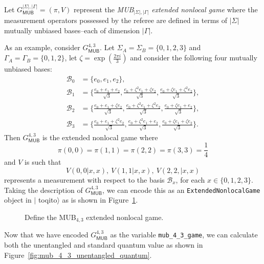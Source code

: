 \documentclass[nofootinbib,superscriptaddress,a4paper,twocolumn,longbibliography,floatfix,pra]{revtex4-2}
\renewcommand{\abs}[1]{\lvert #1 \rvert}
\newcommand{\toqitofont}{%
	\fontfamily{FiraSans}%
	\selectfont}
\newcommand{\toqito}{ $|${\toqitofont toqito}$\rangle$\xspace}
\newcommand{\B}{\mathcal{B}}
\def\MUB{\mathsf{MUB}}
\begin{document}
Let $G_{\MUB}^{\abs{\Sigma}, \abs{\Gamma}} = (\pi, V)$ represent the
\emph{MUB$_{\abs{\Sigma}, \abs{\Gamma}}$ extended nonlocal game} where the
measurement operators possessed by the referee are defined in terms of
$\abs{\Sigma}$ mutually unbiased bases--each of dimension $\abs{\Gamma}$.

As an example, consider $G_{\MUB}^{4, 3}$. Let $\Sigma_A =
\Sigma_B = \{0, 1, 2, 3\}$ and $\Gamma_A = \Gamma_B = \{0, 1, 2\}$, let $\zeta
= \exp(\frac{2\pi i}{3})$ and consider the following four mutually unbiased
bases:
\begin{equation}
    \begin{aligned}
        \B_0 &= \{e_0, e_1, e_2\}, \\
        \B_1 &= \{\frac{e_0 + e_1 + e_2}{\sqrt{3}}, 
                  \frac{e_0 + \zeta^2 e_1 + \zeta e_2}{\sqrt{3}}, 
                  \frac{e_0 + \zeta e_1 + \zeta^2 e_2}{\sqrt{3}}\}, \\
        \B_2 &= \{\frac{e_0 + e_1 + \zeta e_2}{\sqrt{3}},
                  \frac{e_0 + \zeta^2 e_1 + \zeta^2e_2}{\sqrt{3}},
                  \frac{e_0 + \zeta e_1 + e_2}{\sqrt{3}}\}, \\
        \B_3 &= \{\frac{e_0 + e_1 + \zeta^2 e_2}{\sqrt{3}},
                  \frac{e_0 + \zeta^2 e_1 + e_2}{\sqrt{3}},
                  \frac{e_0 + \zeta e_1 + \zeta e_2}{\sqrt{3}}\}.
    \end{aligned}
\end{equation}
Then $G_{\MUB}^{4,3}$ is the extended nonlocal game where
\begin{equation}
    \pi(0, 0) = \pi(1, 1) = \pi(2, 2) = \pi(3, 3) = \frac{1}{4}
\end{equation}
and $V$ is such that
\begin{equation}
    V(0, 0|x, x), \ V(1, 1|x, x), \ V(2, 2,|x, x)
\end{equation}
represents a measurement with respect to the basis $\B_x$, for each $x \in
\{0,1,2,3\}$. Taking the description of $G_{\MUB}^{4,3}$, we can encode this as
an \texttt{ExtendedNonlocalGame} object in \toqito as is shown in
Figure~\ref{fig:mub_4_3}.

\begin{figure}[!htpb]
    \centering
            
    \caption{Define the MUB$_{4, 3}$ extended nonlocal game.}
    \label{fig:mub_4_3}
\end{figure}

Now that we have encoded $G_{\MUB}^{4,3}$ as the variable
\texttt{mub\_4\_3\_game}, we can calculate both the unentangled and standard
quantum value as shown in
Figure~\ref{fig:mub_4_3_unentangled_quantum}.
\end{document}
